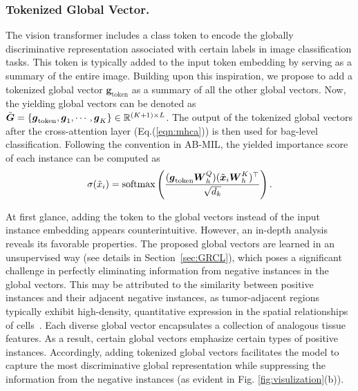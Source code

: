 \documentclass[runningheads]{llncs}
\begin{document}
\subsubsection{Tokenized Global Vector.}
The vision transformer includes a class token to encode the globally discriminative representation associated with certain labels in image classification tasks. This token is typically added to the input token embedding by serving as a summary of the entire image. Building upon this inspiration, we propose to add a tokenized global vector $\boldsymbol{g}_{\operatorname{token}}$ as a summary of all the other global vectors. Now, the yielding global vectors can be denoted as  $\Tilde{\boldsymbol{G}}=\{\boldsymbol{g}_{\operatorname{token}}, 
 \boldsymbol{g}_1, \cdots, \boldsymbol{g}_K \} \in \mathbb{R}^{(K+1) \times L}$. The output of the tokenized global vectors after the cross-attention layer (Eq.(\ref{eqn:mhca})) is then used for bag-level classification. Following the convention in AB-MIL, the yielded importance score of each instance can be computed as 
 \begin{equation}
     \sigma(\Tilde{x}_i) = \operatorname{softmax}\left(\frac{(\boldsymbol{g}_{\operatorname{token}} \boldsymbol{W}_{h}^{Q})(\Tilde{\boldsymbol{x}}_i \boldsymbol{W}_{h}^{K})^{\top}}{\sqrt{d_{k}}} \right).
 \end{equation}
 
At first glance, adding the token to the global vectors instead of the input instance embedding appears counterintuitive. However, an in-depth analysis reveals its favorable properties. The proposed global vectors are learned in an unsupervised way (see details in Section~\ref{sec:GRCL}), which poses a significant challenge in perfectly eliminating information from negative instances in the global vectors.  This may be attributed to the similarity between positive instances and their adjacent negative instances, as tumor-adjacent regions typically exhibit high-density, quantitative expression in the spatial relationships of cells~\cite{similaritysupport}. Each diverse global vector encapsulates a collection of analogous tissue features. As a result, certain global vectors emphasize certain types of positive instances. Accordingly, adding tokenized global vectors facilitates the model to capture the most discriminative global representation while suppressing the information from the negative instances (as evident in Fig. \ref{fig:visulization}(b)).  
\end{document}
